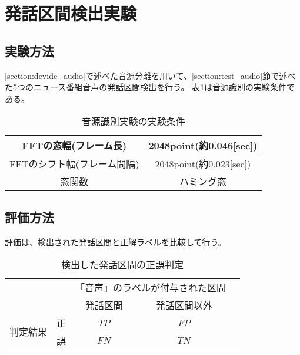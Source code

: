 \section{発話区間検出実験}
\subsection{実験方法}
\ref{section:devide_audio}で述べた音源分離を用いて、\ref{section:test_audio}節で述べた5つのニュース番組音声の発話区間検出を行う。
表\ref{table:detail_identification_method}は音源識別の実験条件である。

\begin{table}[H]
  \begin{center}
    \caption{音源識別実験の実験条件 \label{table:detail_identification_method}}
    \begin{tabular}{|c||c|} \hline
      FFTの窓幅(フレーム長) & 2048point(約0.046[sec])   \\ \hline
      FFTのシフト幅(フレーム間隔) &  2048point(約0.023[sec]) \\ \hline
      窓関数 & ハミング窓  \\ \hline
    \end{tabular}
  \end{center}
\end{table}

\subsection{評価方法}
評価は、検出された発話区間と正解ラベルを比較して行う。

\begin{table}[H]
\begin{center}
    \caption{検出した発話区間の正誤判定 \label{table:search_table}}
\begin{tabular}{|c|c|c|c|l}
\cline{1-4}
\multicolumn{2}{|c|}{\multirow{2}{*}{}} & \multicolumn{2}{c|}{「音声」のラベルが付与された区間} &  \\ \cline{3-4}
\multicolumn{2}{|c|}{}                  & 発話区間        & 発話区間以外        &  \\ \cline{1-4}
\multirow{2}{*}{判定結果}        & 正        & $TP$                  & $FP$                   &  \\ \cline{2-4}
& 誤        & $FN$                  & $TN$                   &  \\ \cline{1-4}
\end{tabular}
\end{center}
\end{table}

